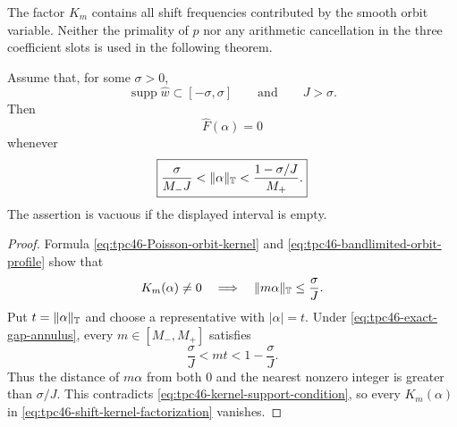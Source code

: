 The factor \(K_m\) contains all shift frequencies contributed by the
smooth orbit variable.  Neither the primality of \(p\) nor any
arithmetic cancellation in the three coefficient slots is used in
the following theorem.

\begin{theorem}
\label{thm:tpc46-exact-shift-spectral-gap}
Assume that, for some \(\sigma>0\),
\begin{equation}
 \operatorname{supp}\widehat w\subset[-\sigma,\sigma]
 \qquad\text{and}\qquad J>\sigma.
 \label{eq:tpc46-bandlimited-orbit-profile}
\end{equation}
Then
\begin{equation}
 \widehat F(\alpha)=0
 \label{eq:tpc46-exact-gap-vanishing}
\end{equation}
whenever
\begin{equation}
 \boxed{
 \frac{\sigma}{M_-J}
 <\|\alpha\|_{\mathbb T}<
 \frac{1-\sigma/J}{M_+}.}
 \label{eq:tpc46-exact-gap-annulus}
\end{equation}
The assertion is vacuous if the displayed interval is empty.
\end{theorem}

\begin{proof}
Formula \eqref{eq:tpc46-Poisson-orbit-kernel} and
\eqref{eq:tpc46-bandlimited-orbit-profile} show that
\begin{equation}
 K_m(\alpha)\ne0
 \quad\Longrightarrow\quad
 \|m\alpha\|_{\mathbb T}\le\frac{\sigma}{J}.
 \label{eq:tpc46-kernel-support-condition}
\end{equation}
Put \(t=\|\alpha\|_{\mathbb T}\) and choose a representative with
\(|\alpha|=t\).  Under \eqref{eq:tpc46-exact-gap-annulus}, every
\(m\in[M_-,M_+]\) satisfies
\[
 \frac{\sigma}{J}<mt<1-\frac{\sigma}{J}.
\]
Thus the distance of \(m\alpha\) from both \(0\) and the nearest
nonzero integer is greater than \(\sigma/J\).  This contradicts
\eqref{eq:tpc46-kernel-support-condition}, so every \(K_m(\alpha)\)
in \eqref{eq:tpc46-shift-kernel-factorization} vanishes.
\end{proof}

